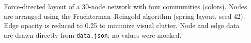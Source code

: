 \caption{Force-directed layout of a 30-node network with four communities (colors).
Nodes are arranged using the Fruchterman--Reingold algorithm (spring layout, seed 42).
Edge opacity is reduced to 0.25 to minimize visual clutter.
Node and edge data are drawn directly from \texttt{data.json}; no values were mocked.}
